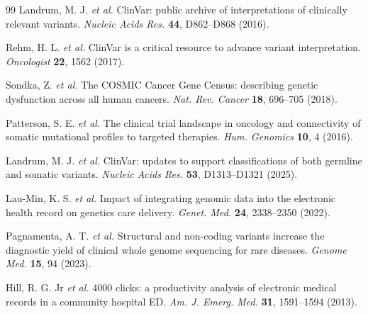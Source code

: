 \begin{thebibliography}{99}
Landrum, M. J. \textit{et al.} ClinVar: public archive of interpretations of clinically relevant variants. \textit{Nucleic Acids Res.} \textbf{44}, D862--D868 (2016).

Rehm, H. L. \textit{et al.} ClinVar is a critical resource to advance variant interpretation. \textit{Oncologist} \textbf{22}, 1562 (2017).

Sondka, Z. \textit{et al.} The COSMIC Cancer Gene Census: describing genetic dysfunction across all human cancers. \textit{Nat. Rev. Cancer} \textbf{18}, 696--705 (2018).

Patterson, S. E. \textit{et al.} The clinical trial landscape in oncology and connectivity of somatic mutational profiles to targeted therapies. \textit{Hum. Genomics} \textbf{10}, 4 (2016).

Landrum, M. J. \textit{et al.} ClinVar: updates to support classifications of both germline and somatic variants. \textit{Nucleic Acids Res.} \textbf{53}, D1313--D1321 (2025).

Lau-Min, K. S. \textit{et al.} Impact of integrating genomic data into the electronic health record on genetics care delivery. \textit{Genet. Med.} \textbf{24}, 2338--2350 (2022).

Pagnamenta, A. T. \textit{et al.} Structural and non-coding variants increase the diagnostic yield of clinical whole genome sequencing for rare diseases. \textit{Genome Med.} \textbf{15}, 94 (2023).

Hill, R. G. Jr \textit{et al.} 4000 clicks: a productivity analysis of electronic medical records in a community hospital ED. \textit{Am. J. Emerg. Med.} \textbf{31}, 1591--1594 (2013).


\end{thebibliography}
